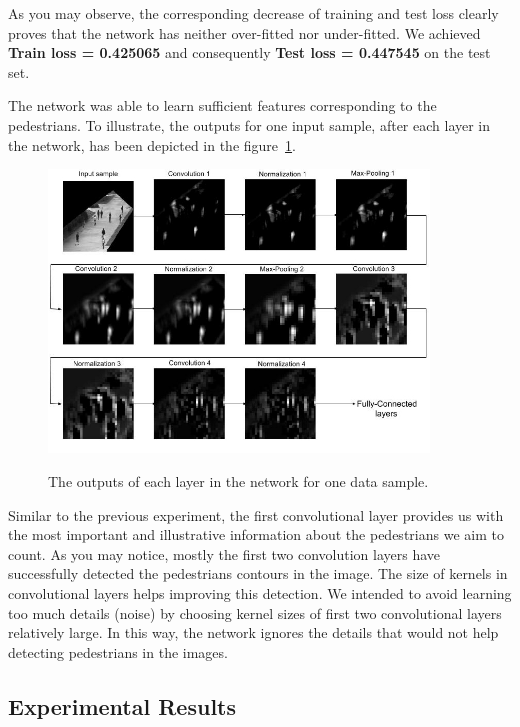 As you may observe, the corresponding decrease of training and test loss clearly proves that the network has neither over-fitted nor under-fitted. We achieved \textbf{Train loss = 0.425065} and consequently \textbf{Test loss = 0.447545} on the test set.

\noindent The network was able to learn sufficient features corresponding to the pedestrians. To illustrate, the outputs for one input sample, after each layer in the network, has been depicted in the figure~\ref{fig:feats}. 



\begin{figure}[H]
	\centering
	{\includegraphics[width=0.9\textwidth]{images/ped_convs}}
	\caption{The outputs of each layer in the network for one data sample. }
	\label{fig:feats}
\end{figure}



Similar to the previous experiment, the first convolutional layer provides us with the most important and illustrative information about the pedestrians we aim to count. As you may notice, mostly the first two convolution layers have successfully detected the pedestrians contours in the image. The size of kernels in convolutional layers helps improving this detection. We intended to avoid learning too much details (noise) by choosing kernel sizes of first two convolutional layers relatively large. In this way, the network ignores the details that would not help detecting pedestrians in the images. 

\subsection{Experimental Results}

